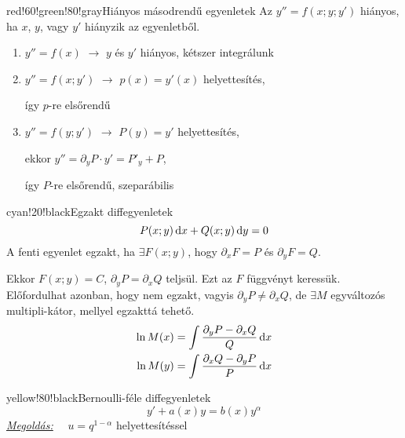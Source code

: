 \documentclass[main.tex]{subfiles}
\begin{document}
\begin{cbox}{red!60!green!80!gray}{Hiányos másodrendű egyenletek}
  Az $y'' = f(x; y; y')$ hiányos, ha $x$, $y$, vagy $y'$
  hiányzik az egyenletből.
  \begin{enumerate}
    \item $y'' = f(x)$
          \tabto{2.65cm} $\rightarrow$ \tabto{3.65cm}
          $y$ és $y'$ hiányos, kétszer integrálunk

    \item $y'' = f(x; y')$
          \tabto{2.65cm} $\rightarrow$ \tabto{3.65cm}
          $p(x) = y'(x)$ helyettesítés,

          \tabto{3.65cm}
          így $p$-re elsőrendű

    \item $y'' = f(y; y')$
          \tabto{2.65cm} $\rightarrow$ \tabto{3.65cm}
          $P(y) = y'$ helyettesítés,

          \tabto{3.65cm}
          ekkor $y'' = \partial_y P \cdot y' = P'_y + P$,

          \tabto{3.65cm}
          így $P$-re elsőrendű, szeparábilis
  \end{enumerate}
\end{cbox}

\begin{cbox}{cyan!20!black}{Egzakt diffegyenletek}
  \[
    P(x;y) \, \mathrm{d} x + Q(x;y) \, \mathrm{d} y = 0
  \]
  A fenti egyenlet egzakt, ha $\exists F(x;y)$, hogy
  $\partial_x F = P$ és $\partial_y F = Q$.

  Ekkor $F(x; y) = C$, $\partial_y P = \partial_x Q$
  teljsül. Ezt az $F$ függvényt keressük.
  \\[2mm]
  Előfordulhat azonban, hogy nem egzakt, vagyis
  $\partial_y P \neq \partial_x Q$, de $\exists M$
  egyváltozós multipli-kátor, mellyel egzakttá tehető.
  \begin{align*}
    \ln M(x)
     & = \int \frac{\partial_y P - \partial_x Q}{Q} \, \mathrm{d} x
    \\
    \ln M(y)
     & = \int \frac{\partial_x Q - \partial_y P}{P} \, \mathrm{d} x
  \end{align*}
\end{cbox}

\begin{cbox}{yellow!80!black}{Bernoulli-féle diffegyenletek}
  \[
    y' + a(x)y = b(x)y^\alpha
  \]
  \emph{\underline{Megoldás:}}
  $\quad u = q^{1-\alpha}$ helyettesítéssel
\end{cbox}
\end{document}
